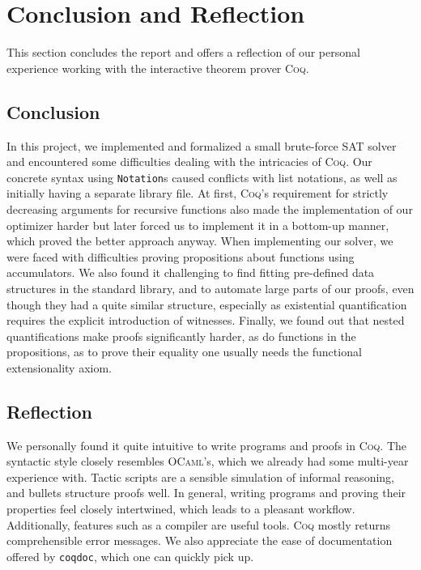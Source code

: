 \section{Conclusion and Reflection}

This section concludes the report and offers a reflection of our personal experience working with the interactive theorem prover \textsc{Coq}.

\subsection{Conclusion}

In this project, we implemented and formalized a small brute-force SAT solver and encountered some difficulties dealing with the intricacies of \textsc{Coq}.
Our concrete syntax using \texttt{Notation}s caused conflicts with list notations, as well as initially having a separate library file.
At first, \textsc{Coq}'s requirement for strictly decreasing arguments for recursive functions also made the implementation of our optimizer harder but later forced us to implement it in a bottom-up manner, which proved the better approach anyway.
When implementing our solver, we were faced with difficulties proving propositions about functions using accumulators.
We also found it challenging to find fitting pre-defined data structures in the standard library, and to automate large parts of our proofs, even though they had a quite similar structure, especially as existential quantification requires the explicit introduction of witnesses.
Finally, we found out that nested quantifications make proofs significantly harder, as do functions in the propositions, as to prove their equality one usually needs the functional extensionality axiom.

\subsection{Reflection}

We personally found it quite intuitive to write programs and proofs in \textsc{Coq}.
The syntactic style closely resembles \textsc{OCaml}'s, which we already had some multi-year experience with.
Tactic scripts are a sensible simulation of informal reasoning, and bullets structure proofs well.
In general, writing programs and proving their properties feel closely intertwined, which leads to a pleasant workflow.
Additionally, features such as a compiler are useful tools.
\textsc{Coq} mostly returns comprehensible error messages.
We also appreciate the ease of documentation offered by \texttt{coqdoc}, which one can quickly pick up.

